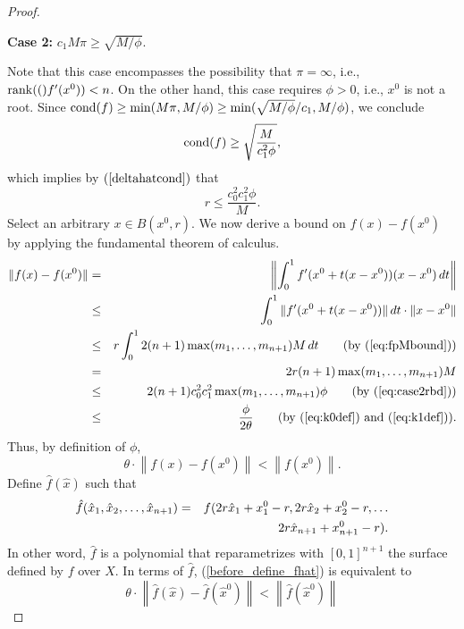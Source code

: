 \documentclass{article}
\newcommand{\cond}[1]{\mathop{\rm{cond}}(#1)}
\newcommand{\norm}[1]{\left\|#1\right\|} \newcommand{\norma}[1]{\left\|#1\right\|}   \newcommand{\inv}[1]{#1^{-1}}
\newcommand\eref[1]{$(\ref{#1})$}
\newcommand{\rank}[1]{\mathop{\rm{rank}}(#1)}
\begin{document}
\begin{proof}
\begin{flushleft} \textbf{Case 2: } $c_1M\pi \ge \sqrt{M/\phi}$.
\end{flushleft}
Note that this case encompasses the possibility that $\pi=\infty$,
i.e., $\rank(f'(x^0))<n$.  On the other hand, this case requires
$\phi>0$, i.e., $x^0$ is not a root.
Since $\cond{f}\ge\min(M\pi,M/\phi)
\ge\min(\sqrt{M/\phi}/c_1,M/\phi)$, we conclude
\begin{equation}
\cond{f}\ge \sqrt{\frac{M}{c_1^2\phi}},
\label{eq:case2condbd}
\end{equation}
which implies by \eref{deltahatcond} that
\begin{equation}
r \le \frac{c_0^2c_1^2\phi}{M}.
\label{eq:case2rbd}
\end{equation}
Select an arbitrary $x\in B(x^0,r)$.  
We now derive a bound on $f(x)-f(x^0)$ by
applying the fundamental theorem
of calculus.
\begin{eqnarray*}
\Vert f(x)-f(x^0)\Vert &=&
\left\Vert\int_0^1 f'(x^0+t(x-x^0))(x-x^0)\,dt \right\Vert\\
&\le& \int_0^1 \Vert f'(x^0+t(x-x^0))\Vert\,dt \cdot \Vert x-x^0\Vert\\
&\le & r\int_0^1 
2(n+1)\max(m_1,\ldots,m_{n+1})M\,dt \qquad\mbox{(by \eref{eq:fpMbound})}\\
&=&
2r(n+1)\max(m_1,\ldots,m_{n+1})M \\
&\le &
2(n+1)c_0^2c_1^2\max(m_1,\ldots,m_{n+1})\phi \qquad\mbox{(by \eref{eq:case2rbd})}
\\
&\le&
\frac{\phi}{2\theta} \qquad\mbox{(by \eref{eq:k0def} and \eref{eq:k1def}).}
\end{eqnarray*}
Thus, by definition of $\phi$,
\begin{equation}
\label{before_define_fhat} \theta\cdot\norm{f(x)-f(x^0)} < \norm{f(x^0)}.
\end{equation}
Define $\hat{f}(\hat{x})$ such that
\begin{eqnarray}
\hat{f}(\hat{x}_1,\hat{x}_2,\ldots, \hat{x}_{n+1}) &=& f(
2r\hat{x}_1+x^0_1-r, 2r\hat{x}_2+x^0_2-r,\ldots \nonumber
\\ && \hspace{11 pt} 2r\hat{x}_{n+1}+x^0_{n+1}-r). \label{rescale}
\end{eqnarray}
In other word, $\hat{f}$ is a polynomial that
reparametrizes with $[0,1]^{n+1}$ the surface defined by $f$ over $X$.
In terms of $\hat{f}$, (\ref{before_define_fhat}) is equivalent to
\[
\theta\cdot\norm{\hat{f}(\hat{x})-\hat{f}(\hat{x}^0)} <
\norm{\hat{f}(\hat{x}^0)}
\]
\end{proof}
\end{document}
